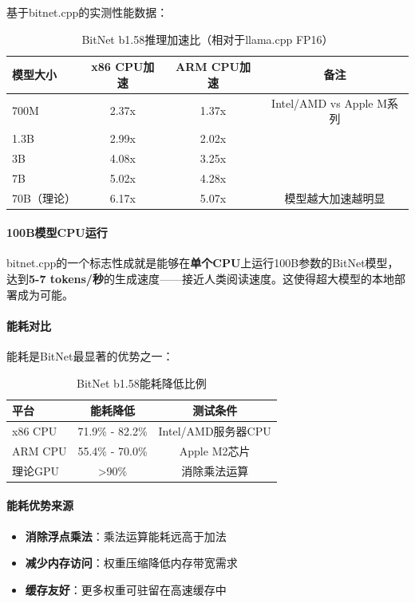 \documentclass[12pt,a4paper]{article}
\begin{document}
基于bitnet.cpp的实测性能数据：

\begin{table}[H]
\centering
\caption{BitNet b1.58推理加速比（相对于llama.cpp FP16）}
\begin{tabular}{lccc}
\toprule
\textbf{模型大小} & \textbf{x86 CPU加速} & \textbf{ARM CPU加速} & \textbf{备注} \\
\midrule
700M & 2.37x & 1.37x & Intel/AMD vs Apple M系列 \\
1.3B & 2.99x & 2.02x & \\
3B & 4.08x & 3.25x & \\
7B & 5.02x & 4.28x & \\
70B（理论） & 6.17x & 5.07x & 模型越大加速越明显 \\
\bottomrule
\end{tabular}
\end{table}

\paragraph{100B模型CPU运行}

bitnet.cpp的一个标志性成就是能够在\textbf{单个CPU}上运行100B参数的BitNet模型，达到\textbf{5-7 tokens/秒}的生成速度——接近人类阅读速度。这使得超大模型的本地部署成为可能。

\paragraph{能耗对比}

能耗是BitNet最显著的优势之一：

\begin{table}[H]
\centering
\caption{BitNet b1.58能耗降低比例}
\begin{tabular}{lcc}
\toprule
\textbf{平台} & \textbf{能耗降低} & \textbf{测试条件} \\
\midrule
x86 CPU & 71.9\% - 82.2\% & Intel/AMD服务器CPU \\
ARM CPU & 55.4\% - 70.0\% & Apple M2芯片 \\
理论GPU & >90\% & 消除乘法运算 \\
\bottomrule
\end{tabular}
\end{table}

\paragraph{能耗优势来源}

\begin{itemize}
    \item \textbf{消除浮点乘法}：乘法运算能耗远高于加法
    \item \textbf{减少内存访问}：权重压缩降低内存带宽需求
    \item \textbf{缓存友好}：更多权重可驻留在高速缓存中
\end{itemize}
\end{document}
